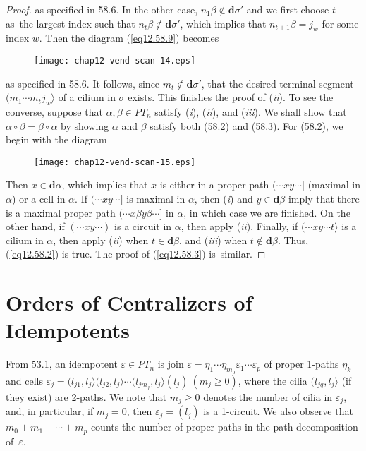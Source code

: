 \documentclass{surv-l}
\numberwithin{equation}{section}
\numberwithin{table}{section}
\numberwithin{figure}{section}
\theoremstyle{definition}
\begin{document}
\begin{proof}
\noindent as specified in 58.6. In the other case, $n_{1}\beta\not\in
\mathbf{d}\sigma'$ and we first choose $t$ as~the largest index
such that $n_{t}\beta\not\in \mathbf{d}\sigma'$, which implies
that $n_{t+1}\beta=j_{w}$ for some index $w$. Then the diagram
(\ref{eq12.58.9}) becomes
\begin{figure}[!h]
\texttt{[image: chap12-vend-scan-14.eps]}
\end{figure}

\noindent as specified in 58.6. It follows, since $m_{t}\not\in
\mathbf{d}\sigma'$, that the desired terminal segment
$(m_{1}\cdots m_{t}j_{w}\rangle$ of a cilium in $\sigma$ exists.
This finishes the proof of (\emph{ii}). To see the converse,
suppose that $\alpha,\beta\in PT_{n}$ satisfy (\emph{i}), (\emph{ii}),
and (\emph{iii}). We shall show that $\alpha \circ\beta=\beta
\circ\alpha$ by showing $\alpha$ and $\beta$ satisfy both (58.2)
and (58.3). For (58.2), we begin with the diagram
\begin{figure}[!h]
\texttt{[image: chap12-vend-scan-15.eps]}
\end{figure}

\noindent Then $x\in \mathbf{d}\alpha$, which implies that $x$ is either in
a proper path $(\cdots xy\cdots]$ (maximal in $\alpha$) or a cell
in $\alpha$. If $(\cdots xy\cdots]$ is maximal in $\alpha$, then
(\emph{i}) and $ y\in \mathbf{d}\beta$ imply that there is a maximal
proper path $(\cdots x\beta y\beta\cdots]$ in $\alpha$, in which case
we are finished. On the other hand, if $(\cdots xy\cdots)$ is a
circuit in $\alpha$, then apply (\emph{ii}). Finally, if $(\cdots
xy\cdots t\rangle$ is a cilium in $\alpha$, then apply (\emph{ii})
when $ t\in \mathbf{d}\beta$, and (\emph{iii}) when $ t\not\in
\mathbf{d}\beta$. Thus, (\ref{eq12.58.2}) is true. The proof of
(\ref{eq12.58.3}) is~similar.
\end{proof}

\section{Orders of Centralizers of Idempotents}\label{sec12.59}

From 53.1, an idempotent $\varepsilon \in PT_{n}$ is join
$\varepsilon=\eta_{1}\cdots\eta_{m_{0}}\varepsilon_{1}\cdots\varepsilon_{p}$
of proper 1-paths $\eta_{k}$ and cells $\varepsilon_{j}=(l_{j1},
l_{j}\rangle(l_{j2}, l_{j}\rangle\cdots(l_{jm_{j}},
l_{j}\rangle(l_{j})\ (m_{j}\geq 0)$, where the cilia $(l_{jq},
l_{j}\rangle$ (if they exist) are 2-paths. We note that $m_{j}\geq
0$ denotes the number of cilia in $\varepsilon_{j}$, and, in
particular, if $m_{j}=0$, then $\varepsilon_{j}=(l_{j})$ is a
1-circuit. We also observe that $m_{0}+m_{1}+\cdots+m_{p}$ counts
the number of proper paths in the path decomposition
of~$\varepsilon$.
\end{document}
